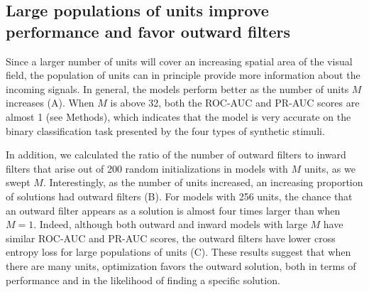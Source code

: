 \documentclass[pdftex,9pt,lineno]{elife}
\begin{document}
\subsection{Large populations of units improve performance and favor outward filters}

Since a larger number of units will cover an increasing spatial area of the visual field, the population of units can in principle provide more information about the incoming signals. In general, the models perform better as the number of units $M$ increases (A). When $M$ is above 32, both the ROC-AUC and PR-AUC scores are almost 1 (see Methods), which indicates that the model is very accurate on the binary classification task presented by the four types of synthetic stimuli.

In addition, we calculated the ratio of the number of outward filters to inward filters that arise out of 200 random initializations in models with $M$ units, as we swept $M$. Interestingly, as the number of units increased, an increasing proportion of solutions had outward filters (B). For models with 256 units, the chance that an outward filter appears as a solution is almost four times larger than when $M=1$. Indeed, although both outward and inward models with large $M$ have similar ROC-AUC and PR-AUC scores,  the outward filters have lower cross entropy loss for large populations of units (C). These results suggest that when there are many units, optimization favors the outward solution, both in terms of performance and in the likelihood of finding a specific solution.
\end{document}
